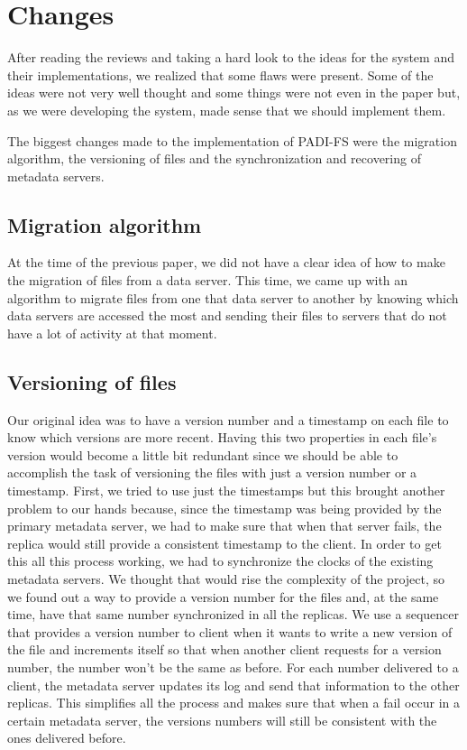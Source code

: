 \section{Changes}

After reading the reviews and taking a hard look to the ideas for the system and
their implementations, we realized that some flaws were present. Some of the
ideas were not very well thought and some things were not even in the paper
but, as we were developing the system, made sense that we should implement
them.

The biggest changes made to the implementation of PADI-FS were the migration
algorithm, the versioning of files and the synchronization and recovering of
metadata servers.

\subsection{Migration algorithm}

At the time of the previous paper, we did not have a clear idea of how to make
the migration of files from a data server. This time, we came up with an algorithm
to migrate files from one that data server to another by knowing which data servers
are accessed the most and sending their files to servers that do not have a lot of
activity at that moment.

\subsection{Versioning of files}

Our original idea was to have a version number and a timestamp on each file to know
which versions are more recent. Having this two properties in each file's version would
become a little bit redundant since we should be able to accomplish the task of
versioning the files with just a version number or a timestamp. First, we tried to use
just the timestamps but this brought another problem to our hands because, since the
timestamp was being provided by the primary metadata server, we had to make sure that
when that server fails, the replica would still provide a consistent timestamp to the client.
In order to get this all this process working, we had to synchronize the clocks of the existing
metadata servers. We thought that would rise the complexity of the project, so we found
out a way to provide a version number for the files and, at the same time, have that same
number synchronized in all the replicas. We use a sequencer that provides a version number
to client when it wants to write a new version of the file and increments itself so that when
another client requests for a version number, the number won't be the same as before.
For each number delivered to a client, the metadata server updates its log and send that
information to the other replicas. This simplifies all the process and makes sure that when
a fail occur in a certain metadata server, the versions numbers will still be consistent with
the ones delivered before.

